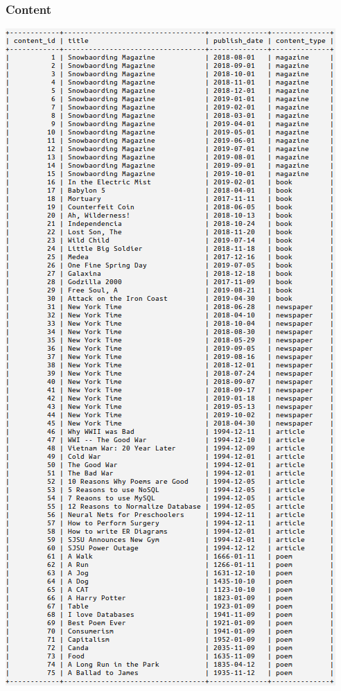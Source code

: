 \documentclass[letter, 12pt, titlepage]{article}
\begin{document}
		\subsubsection{Content}
			\includegraphics[scale=.6]{content.png}
\end{document}
